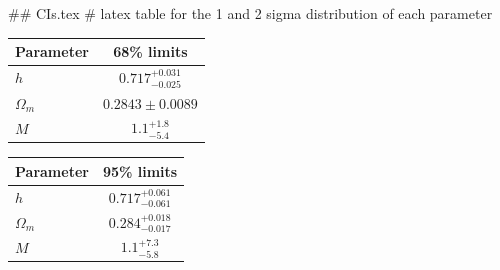 ## CIs.tex
# latex table for the 1 and 2 sigma distribution of each parameter

\begin{tabular} { l  c}
 Parameter &  68\% limits\\
\hline
{\boldmath$h              $} & $0.717^{+0.031}_{-0.025}   $\\
{\boldmath$\Omega_m       $} & $0.2843\pm 0.0089          $\\
{\boldmath$M              $} & $1.1^{+1.8}_{-5.4}         $\\
\hline
\end{tabular}

\begin{tabular} { l  c}
 Parameter &  95\% limits\\
\hline
{\boldmath$h              $} & $0.717^{+0.061}_{-0.061}   $\\
{\boldmath$\Omega_m       $} & $0.284^{+0.018}_{-0.017}   $\\
{\boldmath$M              $} & $1.1^{+7.3}_{-5.8}         $\\
\hline
\end{tabular}
